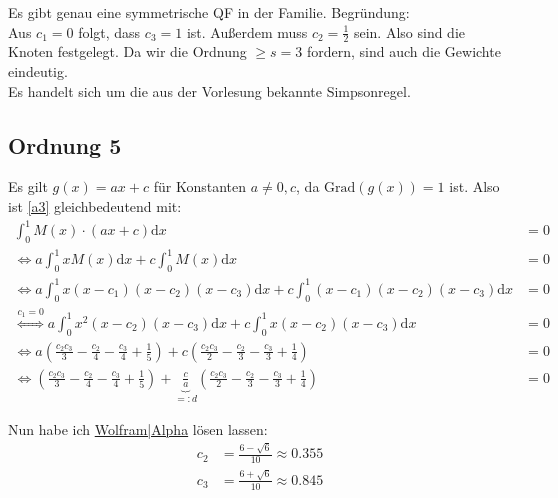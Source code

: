 Es gibt genau eine symmetrische QF in der Familie. Begründung: \\
Aus $c_1 = 0 $ folgt, dass $c_3 = 1$ ist. Außerdem muss $c_2 = \frac{1}{2} $ sein. Also sind die Knoten festgelegt. Da wir die Ordnung $\ge s = 3$ fordern, sind auch die Gewichte eindeutig. \\
Es handelt sich um die aus der Vorlesung bekannte Simpsonregel.

\subsection*{Ordnung 5}
Es gilt $g(x) = ax+c$ für Konstanten $a \neq 0, c$, da $\text{Grad}(g(x))=1$ ist.
Also ist \ref{a3} gleichbedeutend mit:
\begin{align}
	 \int_0^1 M(x) \cdot (ax+c) \mathrm{d}x &= 0 \\
    \Leftrightarrow a \int_0^1 x M(x) \mathrm{d}x + c \int_0^1 M(x) \mathrm{d}x &= 0 \\
    \Leftrightarrow a \int_0^1 x (x-c_1)(x-c_2)(x-c_3) \mathrm{d}x + c \int_0^1 (x-c_1)(x-c_2)(x-c_3) \mathrm{d}x &= 0 \\
    \stackrel{c_1=0}{\Leftrightarrow} a \int_0^1 x^2(x-c_2)(x-c_3) \mathrm{d}x + c \int_0^1 x(x-c_2)(x-c_3) \mathrm{d}x &= 0 \\
    \Leftrightarrow a \left (\frac{c_2 c_3}{3}-\frac{c_2}{4}-\frac{c_3}{4}+\frac{1}{5} \right ) + c \left ( \frac{c_2 c_3}{2}-\frac{c_2}{3}-\frac{c_3}{3}+\frac{1}{4} \right ) &= 0 \\
    \Leftrightarrow \left (\frac{c_2 c_3}{3}-\frac{c_2}{4}-\frac{c_3}{4}+\frac{1}{5} \right ) + \underbrace{\frac{c}{a}}_{=: d} \left ( \frac{c_2 c_3}{2}-\frac{c_2}{3}-\frac{c_3}{3}+\frac{1}{4} \right ) &= 0
\end{align}

Nun habe ich \href{http://www.wolframalpha.com/input/?i=(1%2F5+-+c%2F4+%2B+(b+(-3+%2B+4+c))%2F12)%2B+d*(3+-+4+c+%2B+b+(-4+%2B+6+c))%2F12%3D0}{Wolfram|Alpha} lösen lassen:
\begin{align}
    c_2 &= \frac{6-\sqrt{6}}{10} \approx 0.355\\
    c_3 &= \frac{6+\sqrt{6}}{10} \approx 0.845
\end{align}

